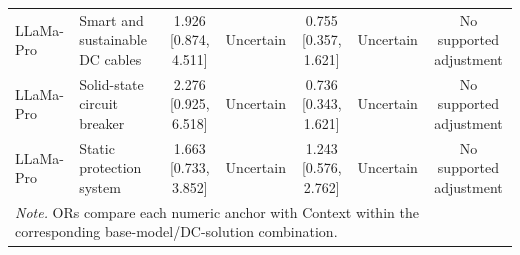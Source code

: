 \begin{landscape}
\begin{longtable}{llccccc}
LLaMa-Pro & Smart and sustainable DC cables & 1.926 [0.874, 4.511] & Uncertain & 0.755 [0.357, 1.621] & Uncertain & No supported adjustment \\
LLaMa-Pro & Solid-state circuit breaker & 2.276 [0.925, 6.518] & Uncertain & 0.736 [0.343, 1.621] & Uncertain & No supported adjustment \\
LLaMa-Pro & Static protection system & 1.663 [0.733, 3.852] & Uncertain & 1.243 [0.576, 2.762] & Uncertain & No supported adjustment \\
\midrule
\multicolumn{7}{p{0.96\linewidth}}{\footnotesize\textit{Note.} ORs compare each numeric anchor with Context within the corresponding base-model/DC-solution combination.}\\
\end{longtable}
\end{landscape}
